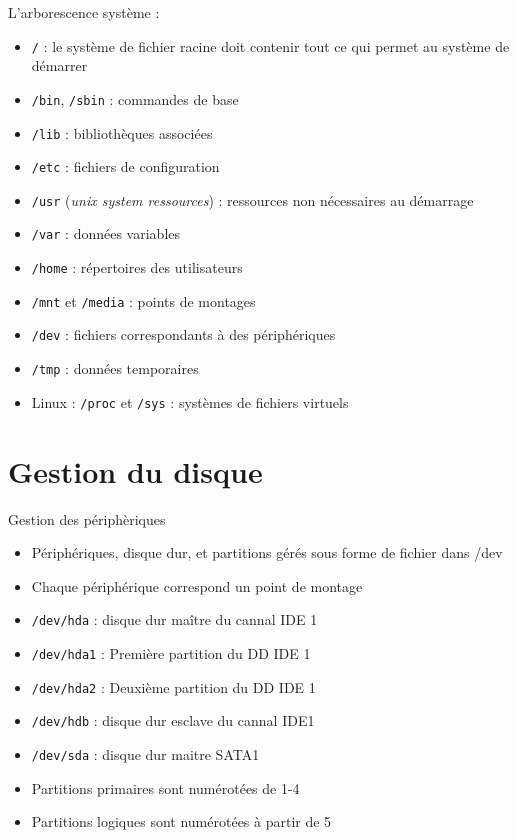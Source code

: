 \documentclass[french]{beamer}
\begin{document}
\begin{frame}
L'arborescence système :
    \begin{itemize}
    \item \texttt{/} : le système de fichier racine doit contenir tout ce qui permet au système de démarrer
    \item \texttt{/bin}, \texttt{/sbin} : commandes de base 
    \item \texttt{/lib} : bibliothèques associées 
    \item \texttt{/etc} : fichiers de configuration
    \item \texttt{/usr} (\textit{unix system ressources}) : ressources non nécessaires au démarrage
    \item \texttt{/var} : données variables
    \item \texttt{/home} : répertoires des utilisateurs
    \item \texttt{/mnt} et \texttt{/media} : points de montages
    \item \texttt{/dev} : fichiers correspondants à des périphériques
    \item \texttt{/tmp} : données temporaires
    \item Linux : \texttt{/proc} et \texttt{/sys} : systèmes de fichiers virtuels
    \end{itemize}
\end{frame}


\section{Gestion du disque}
\frame{\tableofcontents[current]}

\begin{frame}
Gestion des périphèriques
\begin{itemize}
\item Périphériques, disque dur, et partitions gérés sous forme de fichier dans /dev
\item Chaque périphérique correspond un point de montage
\item \texttt{/dev/hda} : disque dur maître du cannal IDE 1
\item \texttt{/dev/hda1} : Première partition du DD IDE 1
\item \texttt{/dev/hda2} : Deuxième partition du DD IDE 1
\item \texttt{/dev/hdb} : disque dur esclave du cannal IDE1
\item \texttt{/dev/sda} : disque dur maitre SATA1
\item Partitions primaires sont numérotées de 1-4
\item Partitions logiques sont numérotées à partir de 5
\end{itemize}
\end{frame}
\end{document}
